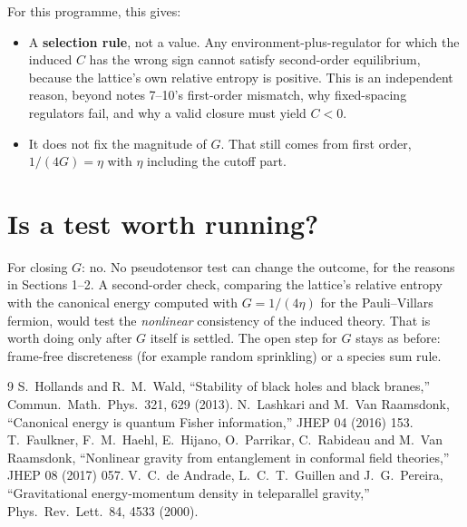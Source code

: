 \documentclass[11pt]{article}
\begin{document}
For this programme, this gives:
\begin{itemize}
\item A \textbf{selection rule}, not a value. Any environment-plus-regulator for which the induced $C$ has the wrong sign cannot satisfy second-order equilibrium, because the lattice's own relative entropy is positive. This is an independent reason, beyond notes 7--10's first-order mismatch, why fixed-spacing regulators fail, and why a valid closure must yield $C<0$.
\item It does not fix the magnitude of $G$. That still comes from first order, $1/(4G)=\eta$ with $\eta$ including the cutoff part.
\end{itemize}

\section{Is a test worth running?}
For closing $G$: no. No pseudotensor test can change the outcome, for the reasons in Sections 1--2. A second-order check, comparing the lattice's relative entropy with the canonical energy computed with $G=1/(4\eta)$ for the Pauli--Villars fermion, would test the \emph{nonlinear} consistency of the induced theory. That is worth doing only after $G$ itself is settled. The open step for $G$ stays as before: frame-free discreteness (for example random sprinkling) or a species sum rule.

\begin{thebibliography}{9}
 S.~Hollands and R.~M.~Wald, ``Stability of black holes and black branes,'' Commun.\ Math.\ Phys.\ 321, 629 (2013).
 N.~Lashkari and M.~Van Raamsdonk, ``Canonical energy is quantum Fisher information,'' JHEP 04 (2016) 153.
 T.~Faulkner, F.~M.~Haehl, E.~Hijano, O.~Parrikar, C.~Rabideau and M.~Van Raamsdonk, ``Nonlinear gravity from entanglement in conformal field theories,'' JHEP 08 (2017) 057.
 V.~C.~de Andrade, L.~C.~T.~Guillen and J.~G.~Pereira, ``Gravitational energy-momentum density in teleparallel gravity,'' Phys.\ Rev.\ Lett.\ 84, 4533 (2000).
\end{thebibliography}
\end{document}
